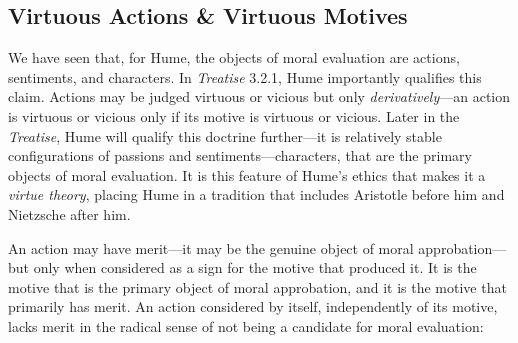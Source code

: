 

\subsection{Virtuous Actions \& Virtuous Motives}\label{sec:virtuous_actions_and_virtuous_motives} %

We have seen that, for Hume, the objects of moral evaluation are actions, sentiments, and characters. In \emph{Treatise} 3.2.1, Hume importantly qualifies this claim. Actions may be judged virtuous or vicious but only \emph{derivatively}---an action is virtuous or vicious only if its motive is virtuous or vicious. Later in the \emph{Treatise}, Hume will qualify this doctrine further---it is relatively stable configurations of passions and sentiments---characters, that are the primary objects of moral evaluation. It is this feature of Hume's ethics that makes it a \emph{virtue theory}, placing Hume in a tradition that includes Aristotle before him and Nietzsche after him.

An action may have merit---it may be the genuine object of moral approbation---but only when considered as a sign for the motive that produced it. It is the motive that is the primary object of moral approbation, and it is the motive that primarily has merit. An action considered by itself, independently of its motive, lacks merit in the radical sense of not being a candidate for moral evaluation:

